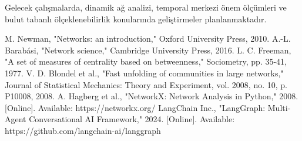 \documentclass[conference]{IEEEtran}
\begin{document}
Gelecek çalışmalarda, dinamik ağ analizi, temporal merkezi önem ölçümleri ve bulut tabanlı ölçeklenebilirlik konularında geliştirmeler planlanmaktadır.

\begin{thebibliography}{00}
 M. Newman, "Networks: an introduction," Oxford University Press, 2010.
 A.-L. Barabási, "Network science," Cambridge University Press, 2016.
 L. C. Freeman, "A set of measures of centrality based on betweenness," Sociometry, pp. 35-41, 1977.
 V. D. Blondel et al., "Fast unfolding of communities in large networks," Journal of Statistical Mechanics: Theory and Experiment, vol. 2008, no. 10, p. P10008, 2008.
 A. Hagberg et al., "NetworkX: Network Analysis in Python," 2008. [Online]. Available: https://networkx.org/
 LangChain Inc., "LangGraph: Multi-Agent Conversational AI Framework," 2024. [Online]. Available: https://github.com/langchain-ai/langgraph
\end{thebibliography}
\end{document}
